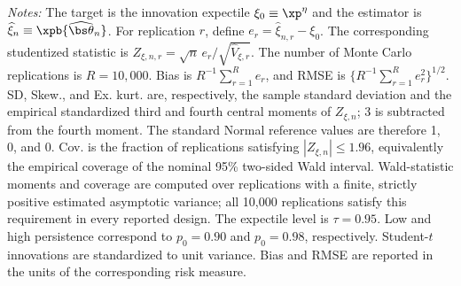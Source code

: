 \begin{table}
\begin{minipage}{0.98\textheight}
\textit{Notes:} The target is the innovation expectile $\xi_0\equiv\xp^\eta$ and the estimator is $\widehat\xi_n\equiv\xpb{\widehat{\bs\theta}_n}$. For replication $r$, define $e_r=\widehat\xi_{n,r}-\xi_0$. The corresponding studentized statistic is $Z_{\xi,n,r}=\sqrt n\,e_r/\sqrt{\widehat V_{\xi,r}}$. The number of Monte Carlo replications is $R=10{,}000$. Bias is $R^{-1}\sum_{r=1}^{R}e_r$, and RMSE is $\{R^{-1}\sum_{r=1}^{R}e_r^2\}^{1/2}$. SD, Skew., and Ex. kurt. are, respectively, the sample standard deviation and the empirical standardized third and fourth central moments of $Z_{\xi,n}$; 3 is subtracted from the fourth moment. The standard Normal reference values are therefore 1, 0, and 0. Cov. is the fraction of replications satisfying $|Z_{\xi,n}|\leq 1.96$, equivalently the empirical coverage of the nominal 95\% two-sided Wald interval. Wald-statistic moments and coverage are computed over replications with a finite, strictly positive estimated asymptotic variance; all 10,000 replications satisfy this requirement in every reported design. The expectile level is $\tau=0.95$. Low and high persistence correspond to $p_0=0.90$ and $p_0=0.98$, respectively. Student-$t$ innovations are standardized to unit variance. Bias and RMSE are reported in the units of the corresponding risk measure.
\end{minipage}
\end{table}
